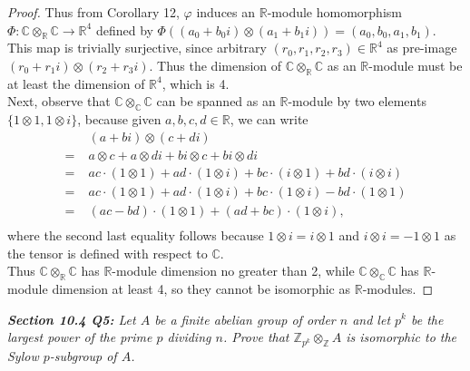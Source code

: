 \documentclass{article}
\begin{document}
\begin{proof}
    Thus from Corollary 12, $\varphi$ induces an $\mathbb{R}$-module
    homomorphism $\Phi:\mathbb{C}\otimes_\mathbb{R}\mathbb{C}\rightarrow
    \mathbb{R}^4$ defined by
    $\Phi((a_0+b_0i)\otimes(a_1+b_1i))=(a_0,b_0,a_1,b_1)$. This map is
    trivially surjective, since arbitrary
    $(r_0,r_1,r_2,r_3)\in\mathbb{R}^4$ as pre-image
    $(r_0+r_1i)\otimes(r_2+r_3i)$. Thus the dimension of
    $\mathbb{C}\otimes_\mathbb{R}\mathbb{C}$ as an $\mathbb{R}$-module must
    be at least the dimension of $\mathbb{R}^4$, which is 4. \\

    Next, observe that $\mathbb{C}\otimes_\mathbb{C}\mathbb{C}$ can be
    spanned as an $\mathbb{R}$-module by two elements
    $\{1\otimes1,1\otimes i\}$, because given $a,b,c,d\in\mathbb{R}$, we can
    write
    \begin{align*}
      &\;(a+bi)\otimes(c+di)\\
      =&\;a\otimes c+a\otimes di +bi\otimes c +bi\otimes di\\
      =&\;ac\cdot(1\otimes1) +ad\cdot(1\otimes i) +bc\cdot(i\otimes1)
        +bd\cdot(i\otimes i)\\
      =&\;ac\cdot(1\otimes1) +ad\cdot(1\otimes i) +bc\cdot(1\otimes i)
        -bd\cdot(1\otimes1)\\
      =&\;(ac-bd)\cdot(1\otimes1) +(ad+bc)\cdot(1\otimes i),\\
    \end{align*}
    where the second last equality follows because $1\otimes i=i\otimes1$
    and $i\otimes i=-1\otimes1$ as the tensor is defined with respect to
    $\mathbb{C}$. \\

    Thus $\mathbb{C}\otimes_\mathbb{R}\mathbb{C}$ has $\mathbb{R}$-module
    dimension no greater than 2, while
    $\mathbb{C}\otimes_\mathbb{C}\mathbb{C}$ has $\mathbb{R}$-module
    dimension at least 4, so they cannot be isomorphic as
    $\mathbb{R}$-modules.
  \end{proof}

\it \textbf{Section 10.4 Q5:} Let $A$ be a finite abelian group of order
  $n$ and let $p^k$ be the largest power of the prime $p$ dividing $n$.
  Prove that $\mathbb{Z}_{p^k}\otimes_\mathbb{Z}A$ is isomorphic to
  the Sylow $p$-subgroup of $A$.
\end{document}
